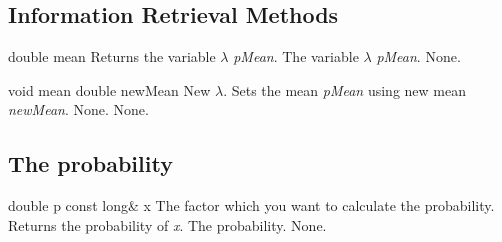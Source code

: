 \vspace*{10mm}

\subsection{Information Retrieval Methods}

\setConstInstance
\printEmptyMethodReturnSpecial
{double}
{mean}
{Returns the variable {\em $\lambda$} {\em pMean}.}
{The variable {\em $\lambda$} {\em pMean}.}
{None.}

\setNormalInstance
\printMethodWithOneParam
{void}
{mean}
{double}
{newMean}
{New $\lambda$.}
{Sets the mean {\em pMean} using new mean {\em newMean}.}
{None.}
{None.}

\vspace*{10mm}

\subsection{The probability}

\setConstInstance
\printMethodWithOneParam
{double}
{p}
{const long\&}
{x}
{The factor which you want to calculate the probability.}
{Returns the probability of {\em x}.}
{The probability.}
{None.}




